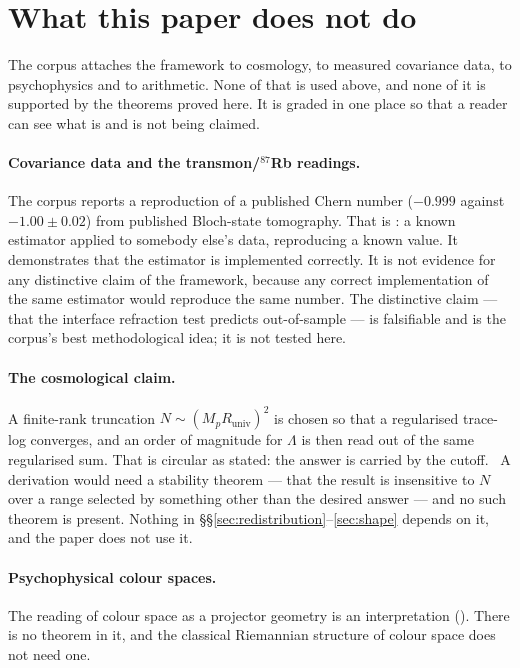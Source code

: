 \section{What this paper does not do}\label{sec:scope}

The corpus attaches the framework to cosmology, to measured covariance data, to psychophysics and
to arithmetic. None of that is used above, and none of it is supported by the theorems proved
here. It is graded in one place so that a reader can see what is and is not being claimed.

\paragraph{Covariance data and the transmon/$^{87}$Rb readings.} The corpus reports a reproduction of a
published Chern number ($-0.999$ against $-1.00\pm0.02$) from published Bloch-state tomography.
That is \Dd: a known estimator applied to somebody else's data, reproducing a known value. It
demonstrates that the estimator is implemented correctly. It is not evidence for any distinctive
claim of the framework, because any correct implementation of the same estimator would reproduce
the same number. The distinctive claim --- that the interface refraction test predicts
out-of-sample --- is falsifiable and is the corpus's best methodological idea; it is not tested
here.

\paragraph{The cosmological claim.} A finite-rank truncation $N\sim(M_pR_{\mathrm{univ}})^2$ is
chosen so that a regularised trace-log converges, and an order of magnitude for $\Lambda$ is then
read out of the same regularised sum. That is circular as stated: the answer is carried by the
cutoff. \Hh\ A derivation would need a stability theorem --- that the result is insensitive to
$N$ over a range selected by something other than the desired answer --- and no such theorem is
present. Nothing in \S\S\ref{sec:redistribution}--\ref{sec:shape} depends on it, and the paper
does not use it.

\paragraph{Psychophysical colour spaces.} The reading of colour space as a projector geometry is
an interpretation (\Hh). There is no theorem in it, and the classical Riemannian structure of
colour space \Cc{} does not need one.

